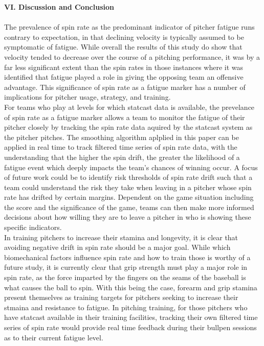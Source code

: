 \documentclass[12 pt]{article}
\begin{document}
\textbf{VI. Discussion and Conclusion} \\\
\\ \indent The prevalence of spin rate as the predominant indicator of pitcher fatigue runs 
contrary to expectation, in that declining velocity is typically assumed to be symptomatic of fatigue. While 
overall the results of this study do show that velocity tended to decrease over the course of a 
pitching performance, it was by a far less significant extent than the spin rates in those instances 
where it was identified that fatigue played a role in giving the opposing team an offensive advantage. This significance of 
spin rate as a fatigue marker has a number of implications for pitcher usage, strategy, and training.
\\ \indent For teams who play at levels for which statcast data is available, the prevelance of 
spin rate as a fatigue marker allows a team to monitor the fatigue of their pitcher closely by tracking 
the spin rate data aquired by the statcast system as the pitcher pitches. The smoothing algorithm aplplied in this 
paper can be applied in real time to track filtered time series of spin rate data, with the understanding that the higher the spin drift, 
the greater the likelihood of a fatigue event which deeply impacts the team's chances of winning occur. 
A focus of future work could be to identify risk thresholds of spin rate drift such that a team could 
understand the risk they take when leaving in a pitcher whose spin rate has drifted by certain margins.
Dependent on the game situation including the score and the significance of the game, teams can then make more 
informed decisions about how willing they are to leave a pitcher in who is showing these specific indicators. 
\\ \indent In training pitchers to increase their stamina and longevity, it is clear that 
avoiding negative drift in spin rate should be a major goal. While which biomechanical factors influence spin rate 
and how to train those is worthy of a future study, it is currently clear that grip strength must play a major role in 
spin rate, as the force imparted by the fingers on the seams of the baseball is what causes the ball to spin. With this being the case, 
forearm and grip stamina present themselves as training targets for pitchers seeking to increase 
their stmaina and resistance to fatigue. In pitching training, for those pitchers who have 
statcast available in their training facilities, tracking their own filtered time series of spin rate 
would provide real time feedback during their bullpen sessions as to their current fatigue level.
\end{document}
